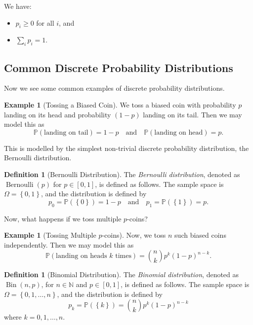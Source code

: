 \documentclass[11pt]{article}
\numberwithin{equation}{section}
\theoremstyle{definition}
\newtheorem{definition}[theorem]{Definition}
\newtheorem{example}[theorem]{Example}
\theoremstyle{remark}
\newcommand{\pqty}[1]{\left(#1\right)}
\newcommand{\Bqty}[1]{\left\{#1\right\}}
\newcommand{\ccintv}[2]{[#1,#2]}
\newcommand{\NN}{\mathbb N}
\newcommand{\qand}{\quad\text{and}\quad}
\newcommand{\Prob}{\mathbb P}
\newcommand{\Bernoulli}{\operatorname{Bernoulli}}
\newcommand{\Binomial}{\operatorname{Bin}}
\begin{document}
We have:
\begin{itemize}
    \item \(p_i \geq 0\) for all \(i\), and
    \item \(\sum_i p_i = 1\).
\end{itemize}

\subsection{Common Discrete Probability Distributions}

Now we see some common examples of discrete probability distributions.

\begin{example}[Tossing a Biased Coin]\label{probability-example-013}
    \label{probability-ex:tossing-biased-coin}%
    We toss a biased coin with probability \(p\) landing on its head and probability \(\pqty{1 - p}\) landing on its tail. Then we may model this as
    \[
        \Prob\pqty{\text{landing on tail}} = 1 - p \qand \Prob\pqty{\text{landing on head}} = p.
    \]
\end{example}

This is modelled by the simplest non-trivial discrete probability distribution, the Bernoulli distribution.

\begin{definition}[Bernoulli Distribution]\label{probability-definition-011}
    \label{probability-def:bernoulli-distribution}%
    The \emph{Bernoulli distribution}, denoted as \(\Bernoulli\pqty{p}\) for \(p \in \ccintv{0}{1}\), is defined as follows. The sample space is \(\Omega = \Bqty{0, 1}\), and the distribution is defined by
    \[
        p_0 = \Prob\pqty{\Bqty{0}} = 1 - p \qand p_1 = \Prob\pqty{\Bqty{1}} = p.
    \]
\end{definition}

Now, what happens if we toss multiple \(p\)-coins? 

\begin{example}[Tossing Multiple \(p\)-coins]\label{probability-example-014}
    \label{probability-ex:tossing-multiple-biased-coins}%
    Now, we toss \(n\) such biased coins independently. Then we may model this as
    \[
        \Prob\pqty{\text{landing on heads }k\text{ times}} = \binom{n}{k} p^k \pqty{1 - p}^{n - k}.
    \]
\end{example}

\begin{definition}[Binomial Distribution]\label{probability-definition-012}
    \label{probability-def:binomial-distribution}%
    The \emph{Binomial distribution}, denoted as \(\Binomial\pqty{n, p}\), for \(n \in \NN\) and \(p \in \ccintv{0}{1}\), is defined as follows. The sample space is \(\Omega = \Bqty{0, 1, \ldots, n}\), and the distribution is defined by
    \[
        p_k = \Prob\pqty{\Bqty{k}}= \binom{n}{k} p^k \pqty{1 - p}^{n - k}
    \]
    where \(k = 0, 1, \ldots, n\).
\end{definition}
\end{document}
